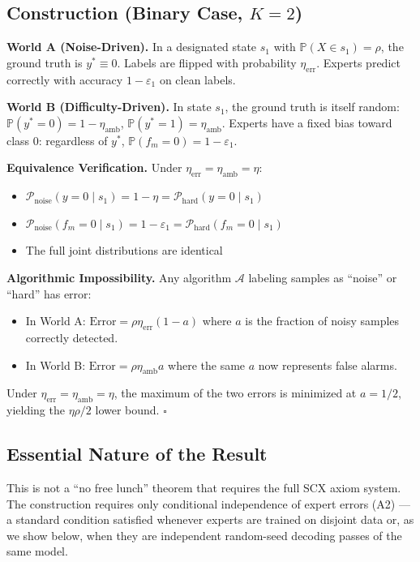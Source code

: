 \documentclass[12pt,a4paper]{ctexart}
\theoremstyle{definition}
\theoremstyle{remark}
\begin{document}
\subsection{Construction (Binary Case, $K=2$)}

\textbf{World A (Noise-Driven).} In a designated state $s_1$ with $\mathbb{P}(X \in s_1) = \rho$, the ground truth is $y^* \equiv 0$. Labels are flipped with probability $\eta_{\text{err}}$. Experts predict correctly with accuracy $1 - \varepsilon_1$ on clean labels.

\textbf{World B (Difficulty-Driven).} In state $s_1$, the ground truth is itself random: $\mathbb{P}(y^*=0) = 1-\eta_{\text{amb}}$, $\mathbb{P}(y^*=1) = \eta_{\text{amb}}$. Experts have a fixed bias toward class 0: regardless of $y^*$, $\mathbb{P}(f_m=0) = 1-\varepsilon_1$.

\textbf{Equivalence Verification.} Under $\eta_{\text{err}} = \eta_{\text{amb}} = \eta$:
\begin{itemize}
\item $\mathcal{P}_{\text{noise}}(y=0 \mid s_1) = 1-\eta = \mathcal{P}_{\text{hard}}(y=0 \mid s_1)$ \checkmark
\item $\mathcal{P}_{\text{noise}}(f_m=0 \mid s_1) = 1-\varepsilon_1 = \mathcal{P}_{\text{hard}}(f_m=0 \mid s_1)$ \checkmark
\item The full joint distributions are identical \checkmark
\end{itemize}

\textbf{Algorithmic Impossibility.} Any algorithm $\mathcal{A}$ labeling samples as ``noise'' or ``hard'' has error:
\begin{itemize}
\item In World A: $\text{Error} = \rho\eta_{\text{err}}(1-a)$ where $a$ is the fraction of noisy samples correctly detected.
\item In World B: $\text{Error} = \rho\eta_{\text{amb}}a$ where the same $a$ now represents false alarms.
\end{itemize}

Under $\eta_{\text{err}} = \eta_{\text{amb}} = \eta$, the maximum of the two errors is minimized at $a = 1/2$, yielding the $\eta\rho/2$ lower bound. \hfill $\square$

\subsection{Essential Nature of the Result}

This is not a ``no free lunch'' theorem that requires the full SCX axiom system. The construction requires only conditional independence of expert errors (A2) — a standard condition satisfied whenever experts are trained on disjoint data or, as we show below, when they are independent random-seed decoding passes of the same model.
\end{document}
